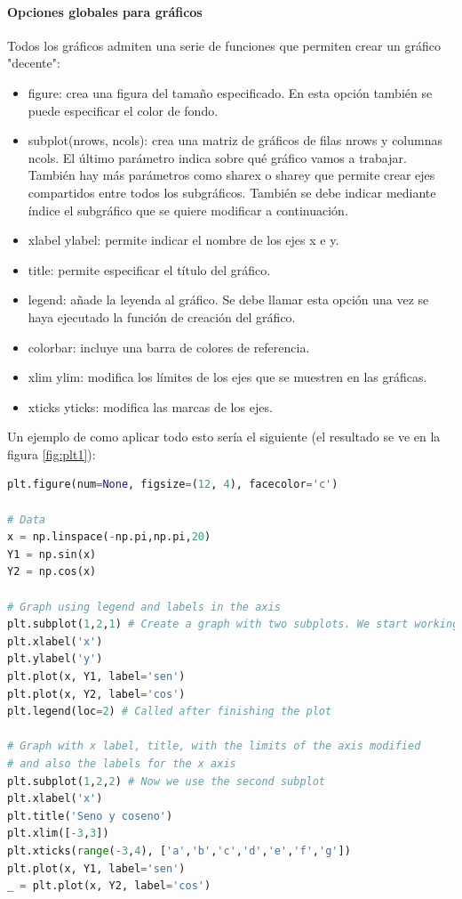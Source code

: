 \paragraph{Opciones globales para gráficos}
Todos los gráficos admiten una serie de funciones que permiten crear un gráfico "decente":
\begin{itemize}
\item figure: crea una figura del tamaño especificado. En esta opción también se puede especificar el color de fondo.
\item subplot(nrows, ncols): crea una matriz de gráficos de filas nrows y columnas ncols. El último parámetro indica sobre qué gráfico vamos a trabajar. También hay más parámetros como sharex o sharey que permite crear ejes compartidos entre todos los subgráficos. También se debe indicar mediante índice el subgráfico que se quiere modificar a continuación.
\item xlabel ylabel: permite indicar el nombre de los ejes x e y.
\item title: permite especificar el título del gráfico.
\item legend: añade la leyenda al gráfico. Se debe llamar esta opción una vez se haya ejecutado la función de creación del gráfico.
\item colorbar: incluye una barra de colores de referencia.
\item xlim ylim: modifica los límites de los ejes que se muestren en las gráficas.
\item xticks yticks: modifica las marcas de los ejes.
\end{itemize}
Un ejemplo de como aplicar todo esto sería el siguiente (el resultado se ve en la figura \ref{fig:plt1}):
\begin{lstlisting}[language=Python]
plt.figure(num=None, figsize=(12, 4), facecolor='c')

# Data
x = np.linspace(-np.pi,np.pi,20)
Y1 = np.sin(x)
Y2 = np.cos(x)

# Graph using legend and labels in the axis
plt.subplot(1,2,1) # Create a graph with two subplots. We start working on the first
plt.xlabel('x')
plt.ylabel('y')
plt.plot(x, Y1, label='sen')
plt.plot(x, Y2, label='cos')
plt.legend(loc=2) # Called after finishing the plot

# Graph with x label, title, with the limits of the axis modified
# and also the labels for the x axis
plt.subplot(1,2,2) # Now we use the second subplot
plt.xlabel('x')
plt.title('Seno y coseno')
plt.xlim([-3,3])
plt.xticks(range(-3,4), ['a','b','c','d','e','f','g'])
plt.plot(x, Y1, label='sen')
_ = plt.plot(x, Y2, label='cos')
\end{lstlisting}

